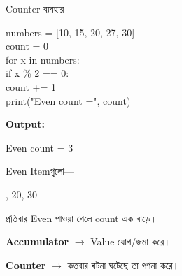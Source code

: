 \begin{codeoutputbox}{Counter ব্যবহার}

\noindent
\begin{minipage}[t]{0.55\linewidth}
\codeheading

\begin{english}
\ttfamily
numbers = [10, 15, 20, 27, 30]\\
count = 0\\[0.5mm]
for x in numbers:\\
\hspace*{4mm}if x \% 2 == 0:\\
\hspace*{8mm}count += 1\\[0.5mm]
print("Even count =", count)
\end{english}

\end{minipage}
\hfill
\begin{minipage}[t]{0.41\linewidth}
\outputheading

\textbf{Output:}

\begin{center}
\textenglish{\ttfamily Even count = 3}
\end{center}

Even Itemগুলো—

\begin{center}
\textenglish{, 20, 30}
\end{center}

প্রতিবার Even পাওয়া গেলে
\textenglish{\ttfamily count}
এক বাড়ে।

\end{minipage}

\end{codeoutputbox}

\begin{rememberbox}

\textbf{Accumulator}
\(\longrightarrow\)
Value যোগ/জমা করে।

\qquad

\textbf{Counter}
\(\longrightarrow\)
কতবার ঘটনা ঘটেছে তা গণনা করে।

\end{rememberbox}



